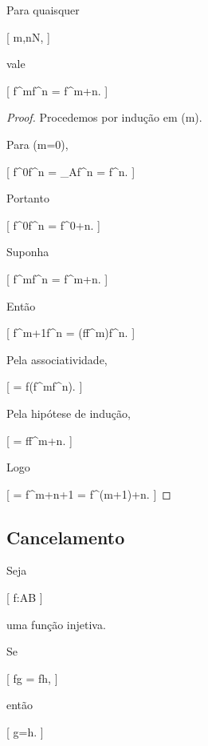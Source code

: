 \documentclass[../../main]{subfiles}
\begin{document}
\begin{prop}
	\label{prop:matematica:funcoes:composicao:lei-potencias}

	Para quaisquer

		[
			m,n\in\mathbb N,
		]

	vale

		[
			f^m\circ f^n
			=
			f^{m+n}.
		]

\end{prop}

\begin{proof}

	Procedemos por indução em (m).

	Para (m=0),

	[
			f^0\circ f^n
			=
			_A\circ f^n
			=
			f^n.
		]

	Portanto

		[
			f^0\circ f^n
			=
			f^{0+n}.
		]

	Suponha

		[
			f^m\circ f^n
			=
			f^{m+n}.
		]

	Então

	[
	f^{m+1}\circ f^n
	=
	(f\circ f^m)\circ f^n.
	]

	Pela associatividade,

	[
			=
			f\circ(f^m\circ f^n).
		]

	Pela hipótese de indução,

	[
			=
			f\circ f^{m+n}.
		]

	Logo

		[
			=
			f^{m+n+1}
			=
			f^{(m+1)+n}.
		]

\end{proof}

\subsection{Cancelamento}

\begin{prop}
	\label{prop:matematica:funcoes:composicao:cancelamento-esquerda}

	Seja

		[
			f:A\to B
		]

	uma função injetiva.

	Se

		[
			f\circ g
			=
			f\circ h,
		]

	então

	[
	g=h.
	]

\end{prop}
\end{document}
